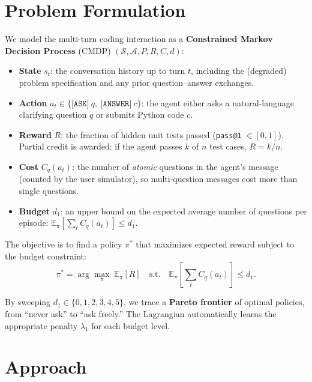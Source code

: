\documentclass[11pt]{article}
\begin{document}
\section{Problem Formulation}

We model the multi-turn coding interaction as a \textbf{Constrained Markov Decision Process} (CMDP) $(\mathcal{S}, \mathcal{A}, P, R, C, d)$:

\begin{itemize}[nosep]
  \item \textbf{State} $s_t$: the conversation history up to turn $t$, including the (degraded) problem specification and any prior question--answer exchanges.
  \item \textbf{Action} $a_t \in \{\texttt{[ASK]}~q,~\texttt{[ANSWER]}~c\}$: the agent either asks a natural-language clarifying question $q$ or submits Python code $c$.
  \item \textbf{Reward} $R$: the fraction of hidden unit tests passed (\texttt{pass@1} $\in [0,1]$). Partial credit is awarded: if the agent passes $k$ of $n$ test cases, $R = k/n$.
  \item \textbf{Cost} $C_q(a_t)$: the number of \emph{atomic} questions in the agent's message (counted by the user simulator), so multi-question messages cost more than single questions.
  \item \textbf{Budget} $d_1$: an upper bound on the expected average number of questions per episode: $\mathbb{E}_\pi\!\left[\sum_t C_q(a_t)\right] \leq d_1$.
\end{itemize}

The objective is to find a policy $\pi^*$ that maximizes expected reward subject to the budget constraint:
\begin{equation}
  \pi^* = \arg\max_\pi \; \mathbb{E}_\pi[R] \quad \text{s.t.} \quad \mathbb{E}_\pi\!\left[\textstyle\sum_t C_q(a_t)\right] \leq d_1.
  \label{eq:cmdp}
\end{equation}

By sweeping $d_1 \in \{0, 1, 2, 3, 4, 5\}$, we trace a \textbf{Pareto frontier} of optimal policies, from ``never ask'' to ``ask freely.'' The Lagrangian automatically learns the appropriate penalty $\lambda_1$ for each budget level.

\section{Approach}
\end{document}
